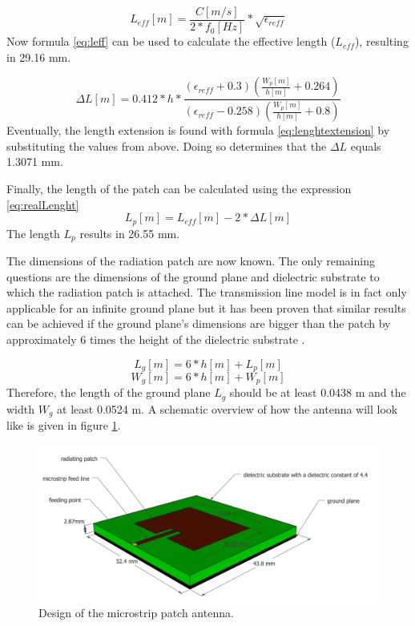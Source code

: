 \begin{equation} 
L_{eff} [m] = \frac{C [m/s]}{2*f_0 [Hz]}*\sqrt{\epsilon_{reff}}
\label{eq:leff}
\end{equation}
Now formula \ref{eq:leff} can be used to calculate the effective length ($L_{eff}$), resulting in 29.16 mm.

\begin{equation} 
\Delta L [m]= 0.412*h*\frac{(\epsilon_{reff}+0.3)\left(\frac{W_{p} [m]}{h [m]}+0.264\right)}{\left(\epsilon_{reff}-0.258\right)\left(\frac{W_{p} [m]}{h [m]}+0.8\right)}
\label{eq:lenghtextension}
\end{equation}
Eventually, the length extension is found with formula \ref{eq:lenghtextension} by substituting the values from above.
Doing so determines that the $\Delta L$ equals 1.3071 mm.

Finally, the length of the patch can be calculated using the expression \ref{eq:realLenght}
\begin{equation} 
L_p [m]= L_{eff} [m] - 2 * \Delta L [m]
\label{eq:realLenght}
\end{equation}
The length $L_p$ results in 26.55 mm.

The dimensions of the radiation patch are now known. The only remaining questions are the dimensions of the ground plane and dielectric substrate to which the 
radiation patch is attached. The transmission line model is in fact only applicable for an infinite ground plane but it has been proven that similar results
can be achieved if the ground plane's dimensions are bigger than the patch by approximately 6 times the height of the dielectric substrate \cite{J14_antennadesign,J15_antennadesign}.

\begin{equation} 
L_{g} [m] = 6 * h [m] + L_p [m]
\end{equation}
\begin{equation} 
W_{g} [m] = 6 * h [m] + W_p [m]
\end{equation}
Therefore, the length of the ground plane $L_{g}$ should be at least 0.0438 m and the width $W_{g}$ at least 0.0524 m.
A schematic overview of how the antenna will look like is given in figure \ref{fig:antennadesign}.
\begin{figure}[h!]
\centering
  \includegraphics[width=\textwidth]{../images/MicrostripAntenna.png}
  \caption{Design of the microstrip patch antenna.}
  \label{fig:antennadesign}
\end{figure}

